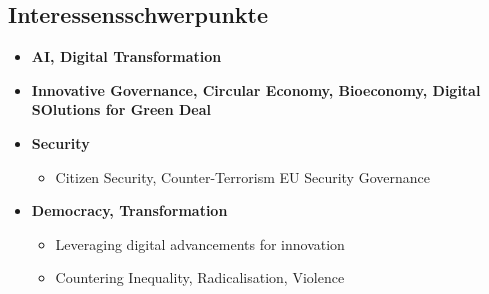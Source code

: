 \subsection{Interessensschwerpunkte}
\begin{itemize}
	\item \textbf{AI, Digital Transformation}
	\item \textbf{Innovative Governance, Circular Economy, Bioeconomy, Digital SOlutions for Green Deal}
	\item \textbf{Security}
	      \begin{itemize}
		      \item Citizen Security, Counter-Terrorism
		            EU Security Governance
	      \end{itemize}
	\item \textbf{Democracy, Transformation}
	      \begin{itemize}
		      \item Leveraging digital advancements for innovation
		      \item Countering Inequality, Radicalisation, Violence
	      \end{itemize}
\end{itemize}




\printbibliography

